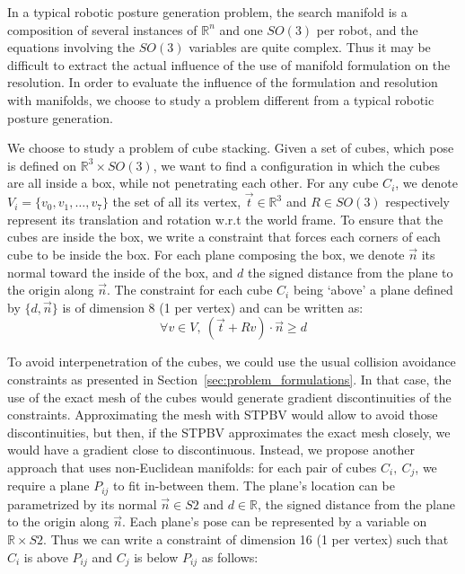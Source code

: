 In a typical robotic posture generation problem, the search manifold is a composition of several instances of $\mathbb{R}^n$ and one $SO(3)$ per robot, and the equations involving the $SO(3)$ variables are quite complex.
Thus it may be difficult to extract the actual influence of the use of manifold formulation on the resolution.
In order to evaluate the influence of the formulation and resolution with manifolds, we choose to study a problem different from a typical robotic posture generation.

We choose to study a problem of cube stacking.
Given a set of cubes, which pose is defined on $\mathbb{R}^3 \times SO(3)$, we want to find a configuration in which the cubes are all inside a box, while not penetrating each other.
For any cube $C_i$, we denote $V_i = \{v_0, v_1, \ldots, v_7\}$  the set of all its vertex, $\vec{t}\in\mathbb{R}^3$ and $R\in SO(3)$ respectively represent its translation and rotation w.r.t the world frame.
To ensure that the cubes are inside the box, we write a constraint that forces each corners of each cube to be inside the box.
For each plane composing the box, we denote $\vec{n}$ its normal toward the inside of the box, and $d$ the signed distance from the plane to the origin along $\vec{n}$.
The constraint for each cube $C_i$ being `above' a plane defined by $\{d, \vec{n}\}$ is of dimension 8 (1 per vertex) and can be written as:
\begin{equation}
  \forall v\in V,\ (\vec{t} + R v)\cdot \vec{n} \geq d
\end{equation}

To avoid interpenetration of the cubes, we could use the usual collision avoidance constraints as presented in Section~\ref{sec:problem_formulations}.
In that case, the use of the exact mesh of the cubes would generate gradient discontinuities of the constraints.
Approximating the mesh with STPBV would allow to avoid those discontinuities, but then, if the STPBV approximates the exact mesh closely, we would have a gradient close to discontinuous.
Instead, we propose another approach that uses non-Euclidean manifolds: for each pair of cubes $C_i,\ C_j$, we require a plane $P_{ij}$ to fit in-between them.
The plane's location can be parametrized by its normal $\vec{n}\in S2$ and $d\in\mathbb{R}$, the signed distance from the plane to the origin along $\vec{n}$.
Each plane's pose can be represented by a variable on $\mathbb{R} \times S2$.
Thus we can write a constraint of dimension 16 (1 per vertex) such that $C_i$ is above $P_{ij}$ and $C_j$ is below $P_{ij}$ as follows:

